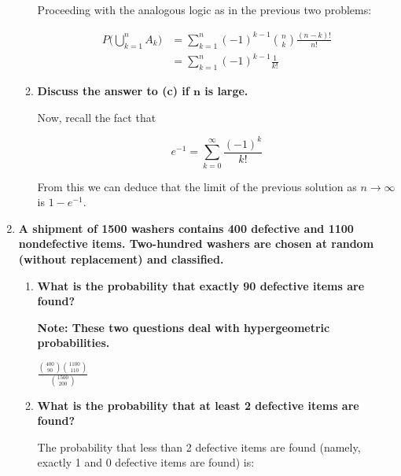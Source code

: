 \documentclass[10pt, oneside]{article}   	%
\theoremstyle{definition}
\begin{document}
\begin{enumerate}[label=2.\arabic*]
\begin{enumerate}
	Proceeding with the analogous logic as in the previous two problems:
	
	\begin{align*}
	P\Bigg( \bigcup^n_{k=1} A_k \Bigg) &= \sum^n_{k=1} (-1)^{k-1} \binom{n}{k} \frac{(n-k)!}{n!} \\
	&= \boxed{ \sum^n_{k=1} (-1)^{k-1} \frac{1}{k!} }
	\end{align*}

	\item \begin{tcolorbox}[
  colback=Cerulean!5!white,
  colframe=Cerulean!75!black]
   \textbf{Discuss the answer to (c) if $\bm{n}$ is large.}
	\end{tcolorbox}
	
	Now, recall the fact that
	
	\[ e^{-1} = \sum^\infty_{k = 0} \frac{(-1)^k}{k!} \]
	
	From this we can deduce that the limit of the previous solution as $n \rightarrow \infty$ is $\boxed{1 - e^{-1}}$.
	\end{enumerate}
\item \begin{tcolorbox}[
  colback=Cerulean!5!white,
  colframe=Cerulean!75!black]
  \textbf{A shipment of 1500 washers contains 400 defective and 1100 nondefective items. Two-hundred washers are chosen at random (without replacement) and classified.}
  \end{tcolorbox}
  
  	\begin{enumerate}
	\item  \begin{tcolorbox}[
  colback=Cerulean!5!white,
  colframe=Cerulean!75!black]
  	\textbf{What is the probability that exactly 90 defective items are found?}
  	 \end{tcolorbox}
	 
	 \textbf{Note: These two questions deal with hypergeometric probabilities.}
	 
	 $\boxed{\frac{\binom{400}{90} \binom{1100}{110}}{\binom{1500}{200}}}$
	 \item  \begin{tcolorbox}[
  colback=Cerulean!5!white,
  colframe=Cerulean!75!black]
  	\textbf{What is the probability that at least 2 defective items are found?}
  	 \end{tcolorbox}
	 
	 The probability that less than 2 defective items are found (namely, exactly 1 and 0 defective items are found) is:
	 

\end{enumerate}
\end{enumerate}
\end{document}
